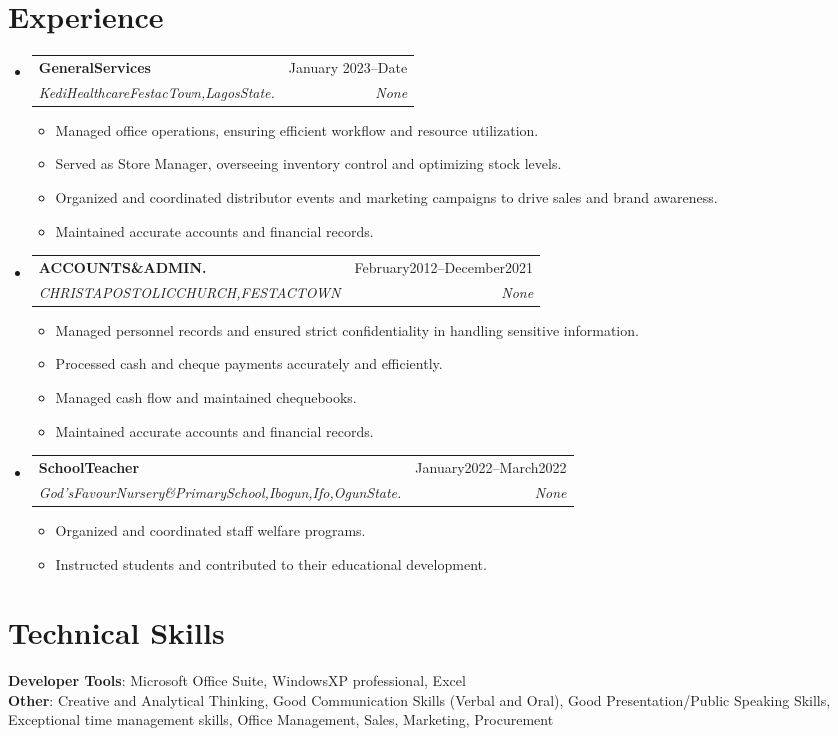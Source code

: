 \documentclass[letterpaper,11pt]{article}
\makeatletter
\newcommand{\resumeItem}[1]{
  \item\small{
    {#1 \vspace{-2pt}}
  }
}
\newcommand{\resumeSubheading}[4]{
  \vspace{-2pt}\item
    \begin{tabular*}{0.97\textwidth}[t]{l@{\extracolsep{\fill}}r}
      \textbf{#1} & #2 \\
      \textit{\small#3} & \textit{\small #4} \\
    \end{tabular*}\vspace{-7pt}
}
\newcommand{\resumeSubHeadingListStart}{\begin{itemize}[leftmargin=0.15in, label={}]}
\newcommand{\resumeSubHeadingListEnd}{\end{itemize}}
\newcommand{\resumeItemListStart}{\begin{itemize}}
\newcommand{\resumeItemListEnd}{\end{itemize}\vspace{-5pt}}
\makeatother
\begin{document}
\section{Experience}
  \resumeSubHeadingListStart
    \resumeSubheading
      {GeneralServices}{January 2023--Date}
      {KediHealthcareFestacTown,LagosState.}{None}
      \resumeItemListStart
        \resumeItem{Managed office operations, ensuring efficient workflow and resource utilization.}
        \resumeItem{Served as Store Manager, overseeing inventory control and optimizing stock levels.}
        \resumeItem{Organized and coordinated distributor events and marketing campaigns to drive sales and brand awareness.}
        \resumeItem{Maintained accurate accounts and financial records.}
      \resumeItemListEnd
    \resumeSubheading
      {ACCOUNTS\&ADMIN.}{February2012--December2021}
      {CHRISTAPOSTOLICCHURCH,FESTACTOWN}{None}
      \resumeItemListStart
        \resumeItem{Managed personnel records and ensured strict confidentiality in handling sensitive information.}
        \resumeItem{Processed cash and cheque payments accurately and efficiently.}
        \resumeItem{Managed cash flow and maintained chequebooks.}
        \resumeItem{Maintained accurate accounts and financial records.}
      \resumeItemListEnd
    \resumeSubheading
      {SchoolTeacher}{January2022--March2022}
      {God’sFavourNursery\&PrimarySchool,Ibogun,Ifo,OgunState.}{None}
      \resumeItemListStart
        \resumeItem{Organized and coordinated staff welfare programs.}
        \resumeItem{Instructed students and contributed to their educational development.}
      \resumeItemListEnd
  \resumeSubHeadingListEnd

\section{Technical Skills}
 \begin{itemize}[leftmargin=0.15in, label={}]
    \small{\item{
     \textbf{Developer Tools}: Microsoft Office Suite, WindowsXP professional, Excel \\
     \textbf{Other}: Creative and Analytical Thinking, Good Communication Skills (Verbal and Oral), Good Presentation/Public Speaking Skills, Exceptional time management skills, Office Management, Sales, Marketing, Procurement
    }}
 \end{itemize}

\end{document}
